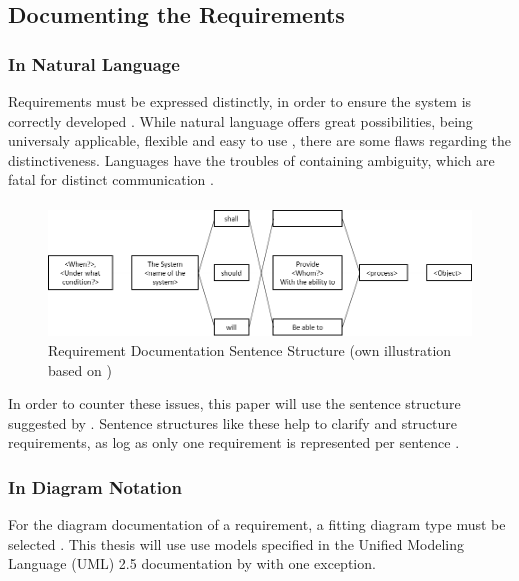 \subsection{Documenting the Requirements}
\subsubsection{In Natural Language}
Requirements must be expressed distinctly, in order to ensure the system is correctly developed \parencites[107]{Ebert.2014}. While natural language offers great possibilities, being universaly applicable, flexible and easy to use \parencite[cf.][239]{Pohl.2007}, there are some flaws regarding the distinctiveness. Languages have the troubles of containing  ambiguity, which are fatal for distinct communication \parencite[cf.][239-243]{Pohl.2007}.

\paragraph{}
\begin{figure}[H]
    \centering
    \includegraphics[width=\textwidth]{img/SentenceStructure.png}
    \caption{Requirement Documentation Sentence Structure (own illustration based on \cite[246]{Pohl.2007})}
    \label{fig:sentencestructure}
\end{figure}

In order to counter these issues, this paper will use the sentence structure suggested by \textcites[107]{Ebert.2014}[246]{Pohl.2007}. Sentence structures like these help to clarify and structure requirements, as log as only one requirement is represented per sentence \parencite[107]{Ebert.2014}. 


\subsubsection{In Diagram Notation}
For the diagram documentation of a requirement, a fitting diagram type must be selected \textcite[299]{Pohl.2007}.  This thesis will use use models specified in the Unified Modeling Language (UML) 2.5 documentation by \textcite{ObjectManagementGroup.01.03.2015} with one exception. 

